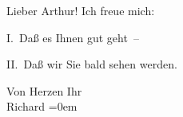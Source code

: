 \pstart{}Lieber Arthur!\pend\vspace{0.5em}
\pstart
           Ich freue mich:\pend
           
\pstart
           I. Daß es Ihnen gut geht –\pend
           
\pstart
           II. Daß wir Sie bald sehen werden.\pend
           
\pstart
           Von Herzen Ihr{\\[\baselineskip]}\spacefill\mbox{Richard}\pend
           \leftskip=0em{}\endnumbering{}  \newcommand{\dateiname}{L01428}\newcommand{\titel}{Richard Beer-Hofmann an Arthur Schnitzler, [16. oder 17]. 8. 1904}\newcommand{\editorInnen}{Martin Anton Müller und Gerd-Hermann Susen}
